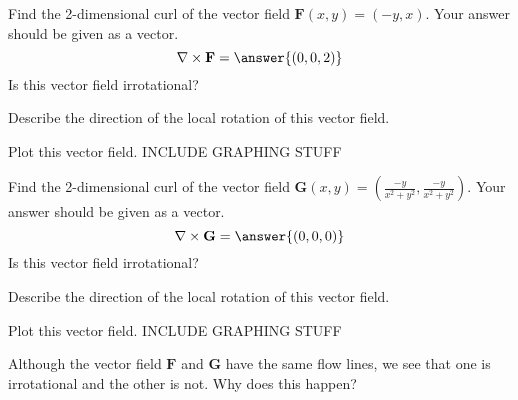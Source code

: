 \begin{problem}
Find the 2-dimensional curl of the vector field $\mathbf{F}(x,y) = (-y,x)$. Your answer should be given as a vector.
\[
\nabla\times\mathbf{F} = \answer{(0,0,2)}
\]
Is this vector field irrotational?
\begin{multipleChoice}
\end{multipleChoice}
Describe the direction of the local rotation of this vector field.
\begin{multipleChoice}
\end{multipleChoice}
Plot this vector field.
INCLUDE GRAPHING STUFF

Find the 2-dimensional curl of the vector field $\mathbf{G}(x,y) = \left(\frac{-y}{x^2+y^2}, \frac{-y}{x^2+y^2}\right)$. Your answer should be given as a vector.
\[
\nabla\times\mathbf{G} = \answer{(0,0,0)}
\]
Is this vector field irrotational?
\begin{multipleChoice}
\end{multipleChoice}
Describe the direction of the local rotation of this vector field.
\begin{multipleChoice}
\end{multipleChoice}
Plot this vector field.
INCLUDE GRAPHING STUFF

Although the vector field $\mathbf{F}$ and $\mathbf{G}$ have the same flow lines, we see that one is irrotational and the other is not. Why does this happen?
\begin{multipleChoice}
\end{multipleChoice}

\end{problem}